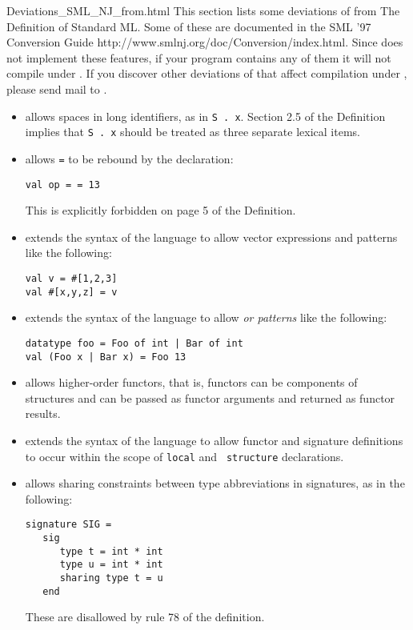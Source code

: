     {Deviations_SML_NJ_from.html}
%
This section lists some deviations of {\smlnj} from The Definition of
Standard ML.  Some of these are documented in the 
\htmladdnormallink
  {SML '97 Conversion Guide}
  {http://www.smlnj.org/doc/Conversion/index.html}.
Since {\mlton} does not implement these features, if your program
contains any of them it will not compile under {\mlton}.  If you discover
other deviations of {\smlnj} that affect compilation under {\mlton},
please send mail to {\mltonmail}.

\begin{itemize}
\item
{\smlnj} allows spaces in long identifiers, as in {\tt S . x}.
Section 2.5 of the Definition implies that {\tt S . x} should be
treated as three separate lexical items.

\item
{\smlnj} allows {\tt =} to be rebound by the declaration:
\begin{verbatim}
val op = = 13
\end{verbatim}
This is explicitly forbidden on page 5 of the Definition.

\item
{\smlnj} extends the syntax of the language to allow
vector expressions and patterns like the following:
\begin{verbatim}
val v = #[1,2,3]
val #[x,y,z] = v
\end{verbatim}
%
\item 
{\smlnj} extends the syntax of the language to allow {\em or patterns}
like the following:
\begin{verbatim}
datatype foo = Foo of int | Bar of int
val (Foo x | Bar x) = Foo 13
\end{verbatim}
%
\item
{\smlnj} allows higher-order functors, that is, functors can be
components of structures and can be passed as functor arguments and
returned as functor results. 

\item
{\smlnj} extends the syntax of the language to allow functor and
signature definitions to occur within the scope of {\tt local} and {\tt
structure} declarations.

\item
{\smlnj} allows sharing constraints between type abbreviations in
signatures, as in the following:
\begin{verbatim}
signature SIG =
   sig
      type t = int * int
      type u = int * int
      sharing type t = u
   end
\end{verbatim}
These are disallowed by rule 78 of the definition.


\end{itemize}
